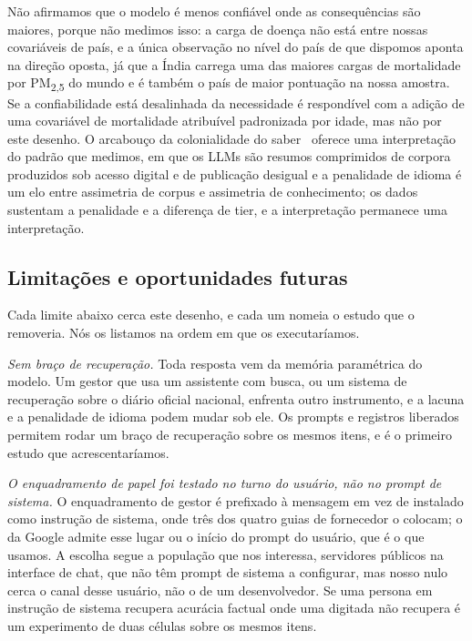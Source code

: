 Não afirmamos que o modelo é menos confiável onde as consequências são maiores,
porque não medimos isso: a carga de doença não está entre nossas covariáveis de
país, e a única observação no nível do país de que dispomos aponta na direção
oposta, já que a Índia carrega uma das maiores cargas de mortalidade por
PM\textsubscript{2,5} do mundo e é também o país de maior pontuação na nossa
amostra. Se a confiabilidade está desalinhada da necessidade é respondível com
a adição de uma covariável de mortalidade atribuível padronizada por idade, mas
não por este desenho. O arcabouço da colonialidade do
saber~\citep{mohamed2020decolonial} oferece uma interpretação do padrão que
medimos, em que os LLMs são resumos comprimidos de corpora produzidos sob
acesso digital e de publicação desigual e a penalidade de idioma é um elo entre
assimetria de corpus e assimetria de conhecimento; os dados sustentam a
penalidade e a diferença de tier, e a interpretação permanece uma
interpretação.

\subsection{Limitações e oportunidades futuras}
\label{sec:limites}

Cada limite abaixo cerca este desenho, e cada um nomeia o estudo que o
removeria. Nós os listamos na ordem em que os executaríamos.

\emph{Sem braço de recuperação.} Toda resposta vem da memória paramétrica do
modelo. Um gestor que usa um assistente com busca, ou um sistema de recuperação
sobre o diário oficial nacional, enfrenta outro instrumento, e a lacuna e a
penalidade de idioma podem mudar sob ele. Os prompts e registros liberados
permitem rodar um braço de recuperação sobre os mesmos itens, e é o primeiro
estudo que acrescentaríamos.

\emph{O enquadramento de papel foi testado no turno do usuário, não no prompt
de sistema.} O enquadramento de gestor é prefixado à mensagem em vez de
instalado como instrução de sistema, onde três dos quatro guias de fornecedor o
colocam; o da Google admite esse lugar ou o início do prompt do usuário, que é o
que usamos. A escolha segue a população que nos interessa, servidores públicos
na interface de chat, que não têm prompt de sistema a configurar, mas nosso
nulo cerca o canal desse usuário, não o de um desenvolvedor. Se uma persona em
instrução de sistema recupera acurácia factual onde uma digitada não recupera
é um experimento de duas células sobre os mesmos itens.

